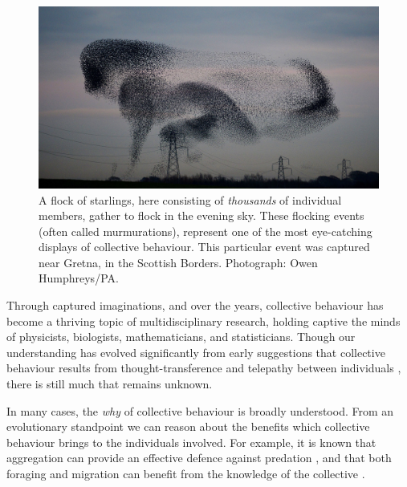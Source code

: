 \begin{figure}[tb]
    \includegraphics[width=\textwidth]{murmuration.jpg}
    \caption{A flock of starlings, here consisting of \emph{thousands} of
        individual members, gather to flock in the evening sky. These flocking
        events (often called murmurations), represent one of the most
        eye-catching displays of collective behaviour. This particular event
        was captured near Gretna, in the Scottish Borders. Photograph: Owen
        Humphreys/PA.}
    \label{fig:murmuration}
\end{figure}

Through captured imaginations, and over the years, collective behaviour has
become a thriving topic of multidisciplinary research, holding captive the
minds of physicists, biologists, mathematicians, and statisticians. Though our
understanding has evolved significantly from early suggestions that collective
behaviour results from thought-transference and telepathy between individuals
\parencite{selous31}, there is still much that remains unknown.

In many cases, the \emph{why} of collective behaviour is broadly understood.
From an evolutionary standpoint we can reason about the benefits which
collective behaviour brings to the individuals involved. For example, it is
known that aggregation can provide an effective defence against predation
\parencite{landeau86}, and that both foraging and migration can benefit from
the knowledge of the collective \parencite{simmons04}.

